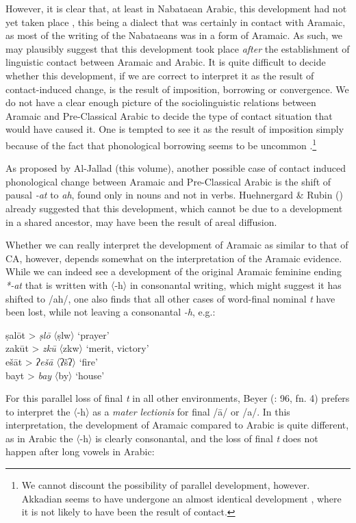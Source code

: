 \documentclass[output=paper]{langsci/langscibook}
\begin{document}
However, it is clear that, at least in Nabataean Arabic, this development had not yet taken place \citep[91--93]{Diem1980}, this being a dialect that was certainly in contact with Aramaic, as most of the writing of the Nabataeans was in a form of Aramaic. As such, we may plausibly suggest that this development took place \textit{after} the establishment of linguistic contact between Aramaic and Arabic. It is quite difficult to decide whether this development, if we are correct to interpret it as the result of contact-induced change, is the result of imposition, borrowing or convergence. We do not have a clear enough picture of the sociolinguistic relations between Aramaic and Pre-Classical Arabic to decide the type of contact situation that would have caused it. One is tempted to see it as the result of imposition simply because of the fact that phonological borrowing seems to be uncommon \citep[526]{Lucas2015}.\footnote{We cannot discount the possibility of parallel development, however. Akkadian seems to have undergone an almost identical development \citep[196]{Huehnergard1997}, where it is not likely to have been the result of contact.} 

As proposed by Al-Jallad (this volume), another possible case of contact induced phonological change between Aramaic and Pre-Classical Arabic is the shift of pausal \textit{-at} to \textit{ah}, found only in nouns and not in verbs. Huehnergard \& Rubin (\citeyear[267--268]{HuehnergardRubin2011}) already suggested that this development, which cannot be due to a development in a shared ancestor, may have been the result of areal diffusion.

Whether we can really interpret the development of Aramaic as similar to that of CA, however, depends somewhat on the interpretation of the Aramaic evidence. While we can indeed see a development of the original Aramaic feminine ending \textit{*-at} that is written with 〈-h〉 in consonantal writing, which might suggest it has shifted to /ah/, one also finds that all other cases of word-final nominal \textit{t} have been lost, while not leaving a consonantal \textit{-h}, e.g.: 

\ea
\ea *ṣalōt > \textit{ṣlō} 〈ṣlw〉 ‘prayer’\\
\ex *zakūt > \textit{zkū} 〈zkw〉 ‘merit, victory’\\
\ex *ešāt > \textit{ʔešā} 〈ʔšʔ〉 ‘fire’\\
\ex *bayt > \textit{bay}  〈by〉 ‘house’
\z
\z

For this parallel loss of final \textit{t} in all other environments, Beyer (\citeyear{Beyer1984}: 96, fn. 4) prefers to interpret the 〈-h〉 as a \textit{mater} \textit{lectionis} for final /ā/ or /a/. In this interpretation, the development of Aramaic compared to Arabic is quite different, as in Arabic the 〈-h〉 is clearly consonantal, and the loss of final \textit{t} does not happen after long vowels in Arabic:
\end{document}
